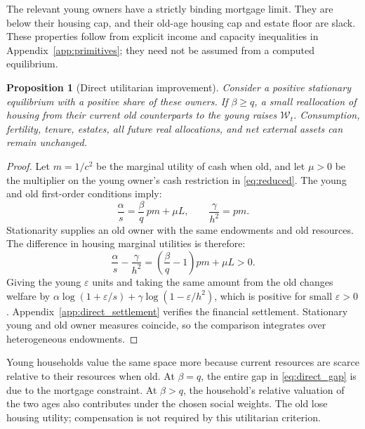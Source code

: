 \documentclass[11pt]{article}
\newtheorem{proposition}{Proposition}
\begin{document}
The relevant young owners have a strictly binding mortgage limit. They are
below their housing cap, and their old-age housing cap and estate floor are
slack. These properties follow from explicit
income and capacity inequalities in Appendix~\ref{app:primitives}; they need
not be assumed from a computed equilibrium.

\begin{proposition}[Direct utilitarian improvement]
\label{prop:direct}
Consider a positive stationary equilibrium with a positive share of these
owners. If $\beta\ge q$, a small reallocation of housing from their current
old counterparts to the young raises $\mathcal W_t$. Consumption, fertility,
tenure, estates, all future real allocations, and net external assets can
remain unchanged.
\end{proposition}

\begin{proof}
Let $m=1/c^2$ be the marginal utility of cash when old, and let $\mu>0$
be the multiplier on the young owner's cash restriction in
\eqref{eq:reduced}. The young and old first-order conditions imply:
\begin{equation}
\frac\alpha s=\frac\beta q\,pm+\mu L,
\qquad \frac\gamma{h^2}=pm.
\end{equation}
Stationarity supplies an old owner with the same endowments and old resources.
The difference in housing marginal utilities is therefore:
\begin{equation}
\boxed{\quad
\frac\alpha s-\frac\gamma{h^2}
=\left(\frac\beta q-1\right)pm+\mu L>0.
\quad}
\label{eq:direct_gap}
\end{equation}
Giving the young $\varepsilon$ units and taking the same amount from the old
changes welfare by
$\alpha\log(1+\varepsilon/s)+\gamma\log(1-\varepsilon/h^2)$, which is
positive for small $\varepsilon>0$. Appendix~\ref{app:direct_settlement}
verifies the financial settlement. Stationary young and old owner measures
coincide, so the comparison integrates over heterogeneous endowments.
\end{proof}

Young households value the same space more because current resources are
scarce relative to their resources when old. At $\beta=q$, the entire gap in
\eqref{eq:direct_gap} is due to the mortgage constraint. At $\beta>q$, the
household's relative valuation of the two ages also contributes under the
chosen social weights. The old lose housing utility; compensation is not
required by this utilitarian criterion.
\end{document}
